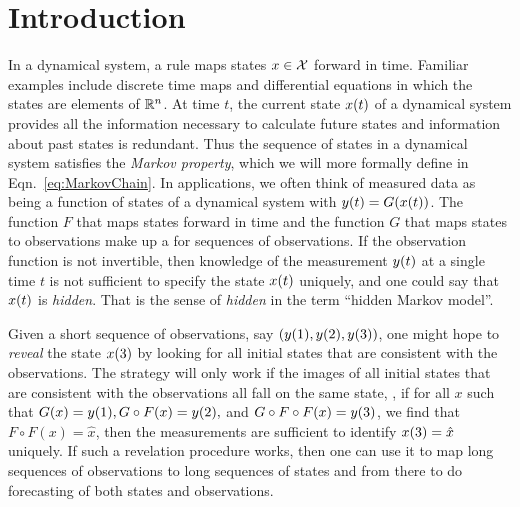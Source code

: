 

\chapter{Introduction}
\label{chap:introduction}

In a dynamical system, a rule maps states $x\in\cal X$ forward in
time.  Familiar examples include discrete time maps
and differential equations
in which the states are elements of $\mathbb{R}^n$.  At time $t$, the
current state ${x}{(t)}$ of a dynamical system provides all the
information necessary to calculate future states and information about
past states is redundant.  Thus the sequence of states in a dynamical
system satisfies the \emph{Markov property}, which we will more
formally define in Eqn.~\eqref{eq:MarkovChain}.  In applications, we
often think of measured data as being a function of states of a
dynamical system with $ {y}{(t)} = G({x}{(t)})$.  The function $F$
that maps states forward in time and the function $G$ that maps states
to observations make up a \emph{} for
sequences of observations.  If the observation function is not
invertible, then knowledge of the measurement ${y}{(t)}$ at a single
time $t$ is not sufficient to specify the state ${x}{(t)}$ uniquely,
and one could say that ${x}{(t)}$ is \emph{hidden}.  That is the
sense of \emph{hidden} in the term ``hidden Markov model''.

Given a short sequence of observations, say $\left(
  {y}{(1)},{y}{(2)}, {y}{(3)}\right)$, one might hope to
\emph{reveal} the state ${x}{(3)}$ by looking for all initial states
that are consistent with the observations.  The strategy will only
work if the images of all initial states that are consistent with the
observations all fall on the same state, \ie, if for all $x$ such that
$ G(x) = {y}{(1)}, G\circ F(x) = {y}{(2)},$ and $G\circ F\circ F(x)
= {y}{(3)}$, we find that $F\circ F(x) = \hat x$, then the
measurements are sufficient to identify ${x}{(3)} = \hat x$ uniquely.
If such a revelation procedure works, then one can use it to map long
sequences of observations to long sequences of states and from there
to do forecasting of both states and observations.


